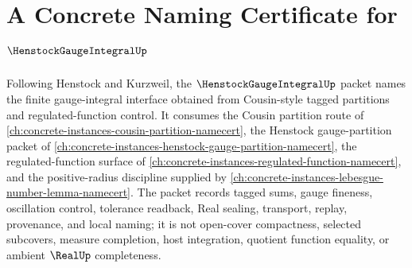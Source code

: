 \chapter{A Concrete Naming Certificate for $\HenstockGaugeIntegralUp$}
\label{ch:concrete-instances-henstock-gauge-integral-namecert}

Following Henstock and Kurzweil, the $\HenstockGaugeIntegralUp$ packet names the finite gauge-integral interface obtained from Cousin-style tagged partitions and regulated-function control. It consumes the Cousin partition route of \autoref{ch:concrete-instances-cousin-partition-namecert}, the Henstock gauge-partition packet of \autoref{ch:concrete-instances-henstock-gauge-partition-namecert}, the regulated-function surface of \autoref{ch:concrete-instances-regulated-function-namecert}, and the positive-radius discipline supplied by \autoref{ch:concrete-instances-lebesgue-number-lemma-namecert}. The packet records tagged sums, gauge fineness, oscillation control, tolerance readback, Real sealing, transport, replay, provenance, and local naming; it is not open-cover compactness, selected subcovers, measure completion, host integration, quotient function equality, or ambient $\RealUp$ completeness.

